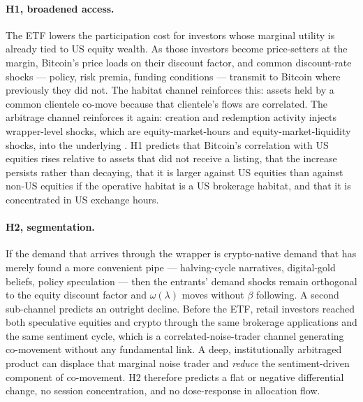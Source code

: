 \documentclass[12pt,a4paper]{article}
\begin{document}
\paragraph{H1, broadened access.} The ETF lowers the participation cost for investors whose marginal utility is already tied to US equity wealth. As those investors become price-setters at the margin, Bitcoin's price loads on their discount factor, and common discount-rate shocks — policy, risk premia, funding conditions — transmit to Bitcoin where previously they did not. The habitat channel reinforces this: assets held by a common clientele co-move because that clientele's flows are correlated. The arbitrage channel reinforces it again: creation and redemption activity injects wrapper-level shocks, which are equity-market-hours and equity-market-liquidity shocks, into the underlying \citep{da2017exchange,brown2020etf}. H1 predicts that Bitcoin's correlation with US equities rises relative to assets that did not receive a listing, that the increase persists rather than decaying, that it is larger against US equities than against non-US equities if the operative habitat is a US brokerage habitat, and that it is concentrated in US exchange hours.

\paragraph{H2, segmentation.} If the demand that arrives through the wrapper is crypto-native demand that has merely found a more convenient pipe — halving-cycle narratives, digital-gold beliefs, policy speculation — then the entrants' demand shocks remain orthogonal to the equity discount factor and $\omega(\lambda)$ moves without $\beta$ following. A second sub-channel predicts an outright decline. Before the ETF, retail investors reached both speculative equities and crypto through the same brokerage applications and the same sentiment cycle, which is a correlated-noise-trader channel generating co-movement without any fundamental link. A deep, institutionally arbitraged product can displace that marginal noise trader and \emph{reduce} the sentiment-driven component of co-movement. H2 therefore predicts a flat or negative differential change, no session concentration, and no dose-response in allocation flow.
\end{document}
